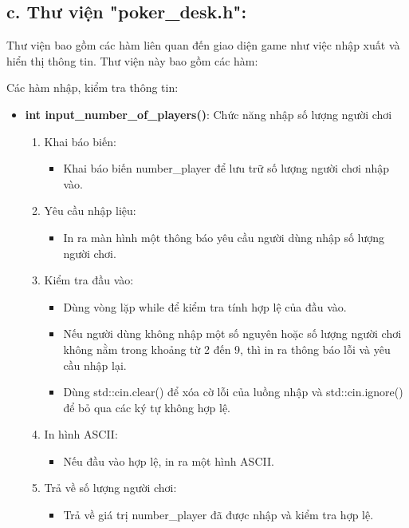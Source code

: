 \documentclass{article}
\begin{document}
    

\subsection{c. Thư viện "poker\_desk.h": }
Thư viện bao gồm các hàm liên quan đến giao diện game như việc nhập xuất và hiển thị thông tin.
Thư viện này bao gồm các hàm:

Các hàm nhập, kiểm tra thông tin:
\begin{itemize}
    \item \textbf{int input\_number\_of\_players()}: Chức năng nhập số lượng người chơi
    \begin{description}
            \begin{enumerate}
            \item Khai báo biến:
                \begin{itemize}
                    \item Khai báo biến number\_player để lưu trữ số lượng người chơi nhập vào.
                \end{itemize}
            \item Yêu cầu nhập liệu:
                \begin{itemize}
                    \item In ra màn hình một thông báo yêu cầu người dùng nhập số lượng người chơi.
                \end{itemize}
            \item Kiểm tra đầu vào:
                \begin{itemize}
                    \item Dùng vòng lặp while để kiểm tra tính hợp lệ của đầu vào.
                    \item Nếu người dùng không nhập một số nguyên hoặc số lượng người chơi không nằm trong khoảng từ 2 đến 9, thì in ra thông báo lỗi và yêu cầu nhập lại.
                    \item Dùng std::cin.clear() để xóa cờ lỗi của luồng nhập và std::cin.ignore() để bỏ qua các ký tự không hợp lệ.
                \end{itemize}
            \item In hình ASCII:
                \begin{itemize}
                    \item Nếu đầu vào hợp lệ, in ra một hình ASCII.
                \end{itemize}
            \item Trả về số lượng người chơi:
                \begin{itemize}
                    \item Trả về giá trị number\_player đã được nhập và kiểm tra hợp lệ.
                \end{itemize}    
        \end{enumerate}
    \end{description}
    

\end{itemize}
\end{document}

